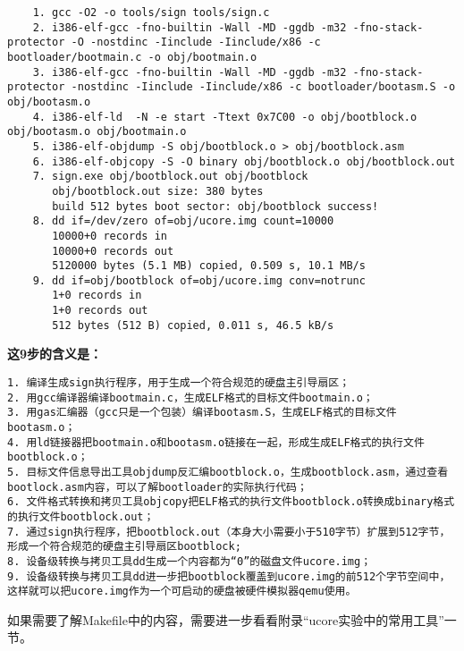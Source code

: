 \begin{lstlisting}
    1. gcc -O2 -o tools/sign tools/sign.c
    2. i386-elf-gcc -fno-builtin -Wall -MD -ggdb -m32 -fno-stack-protector -O -nostdinc -Iinclude -Iinclude/x86 -c bootloader/bootmain.c -o obj/bootmain.o
    3. i386-elf-gcc -fno-builtin -Wall -MD -ggdb -m32 -fno-stack-protector -nostdinc -Iinclude -Iinclude/x86 -c bootloader/bootasm.S -o obj/bootasm.o
    4. i386-elf-ld  -N -e start -Ttext 0x7C00 -o obj/bootblock.o obj/bootasm.o obj/bootmain.o
    5. i386-elf-objdump -S obj/bootblock.o > obj/bootblock.asm
    6. i386-elf-objcopy -S -O binary obj/bootblock.o obj/bootblock.out
    7. sign.exe obj/bootblock.out obj/bootblock
       obj/bootblock.out size: 380 bytes
       build 512 bytes boot sector: obj/bootblock success!
    8. dd if=/dev/zero of=obj/ucore.img count=10000
       10000+0 records in
       10000+0 records out
       5120000 bytes (5.1 MB) copied, 0.509 s, 10.1 MB/s
    9. dd if=obj/bootblock of=obj/ucore.img conv=notrunc
       1+0 records in
       1+0 records out
       512 bytes (512 B) copied, 0.011 s, 46.5 kB/s
\end{lstlisting}

\textbf{这9步的含义是：}

\begin{lstlisting}
1. 编译生成sign执行程序，用于生成一个符合规范的硬盘主引导扇区；
2. 用gcc编译器编译bootmain.c，生成ELF格式的目标文件bootmain.o；
3. 用gas汇编器（gcc只是一个包装）编译bootasm.S，生成ELF格式的目标文件bootasm.o；
4. 用ld链接器把bootmain.o和bootasm.o链接在一起，形成生成ELF格式的执行文件bootblock.o；
5. 目标文件信息导出工具objdump反汇编bootblock.o，生成bootblock.asm，通过查看bootlock.asm内容，可以了解bootloader的实际执行代码；
6. 文件格式转换和拷贝工具objcopy把ELF格式的执行文件bootblock.o转换成binary格式的执行文件bootblock.out；
7. 通过sign执行程序，把bootblock.out（本身大小需要小于510字节）扩展到512字节，形成一个符合规范的硬盘主引导扇区bootblock;
8. 设备级转换与拷贝工具dd生成一个内容都为“0”的磁盘文件ucore.img；
9. 设备级转换与拷贝工具dd进一步把bootblock覆盖到ucore.img的前512个字节空间中，这样就可以把ucore.img作为一个可启动的硬盘被硬件模拟器qemu使用。
\end{lstlisting}

如果需要了解Makefile中的内容，需要进一步看看附录``ucore实验中的常用工具''一节。
